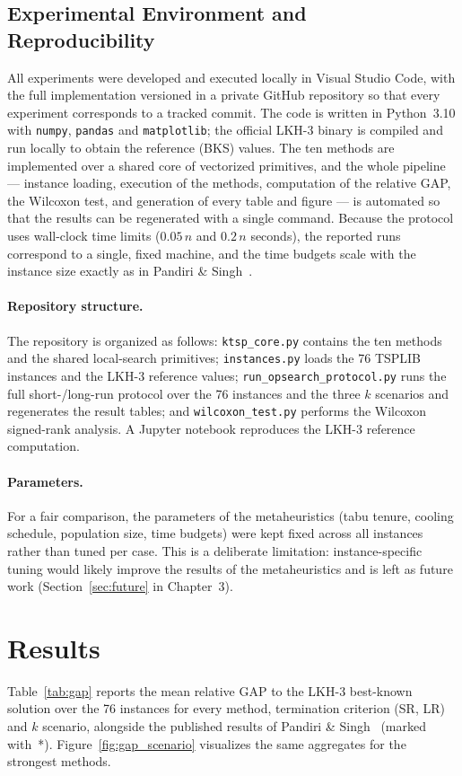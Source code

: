 \documentclass[12pt,a4paper,oneside]{report}
\begin{document}
\subsection*{Experimental Environment and Reproducibility}
All experiments were developed and executed locally in Visual Studio Code, with
the full implementation versioned in a private GitHub repository so that every
experiment corresponds to a tracked commit. The code is written in Python~3.10
with \texttt{numpy}, \texttt{pandas} and \texttt{matplotlib}; the official LKH-3
binary is compiled and run locally to obtain the reference (BKS) values. The ten
methods are implemented over a shared core of vectorized primitives, and the whole
pipeline --- instance loading, execution of the methods, computation of the
relative GAP, the Wilcoxon test, and generation of every table and figure --- is
automated so that the results can be regenerated with a single command. Because the
protocol uses wall-clock time limits ($0.05\,n$ and $0.2\,n$ seconds), the reported
runs correspond to a single, fixed machine, and the time budgets scale with the
instance size exactly as in Pandiri \& Singh~\cite{pandiri2020}.

\paragraph{Repository structure.}
The repository is organized as follows: \texttt{ktsp\_core.py} contains the ten
methods and the shared local-search primitives; \texttt{instances.py} loads the 76
TSPLIB instances and the LKH-3 reference values; \texttt{run\_opsearch\_protocol.py}
runs the full short-/long-run protocol over the 76 instances and the three $k$
scenarios and regenerates the result tables; and \texttt{wilcoxon\_test.py} performs
the Wilcoxon signed-rank analysis. A Jupyter notebook reproduces the LKH-3 reference
computation.

\paragraph{Parameters.}
For a fair comparison, the parameters of the metaheuristics (tabu tenure, cooling
schedule, population size, time budgets) were kept fixed across all instances
rather than tuned per case. This is a deliberate limitation: instance-specific
tuning would likely improve the results of the metaheuristics and is left as future
work (Section~\ref{sec:future} in Chapter~3).

\section{Results}
Table~\ref{tab:gap} reports the mean relative GAP to the LKH-3 best-known solution
over the 76 instances for every method, termination criterion (SR, LR) and $k$
scenario, alongside the published results of Pandiri \& Singh~\cite{pandiri2020}
(marked with~*). Figure~\ref{fig:gap_scenario} visualizes the same aggregates for
the strongest methods.
\end{document}
